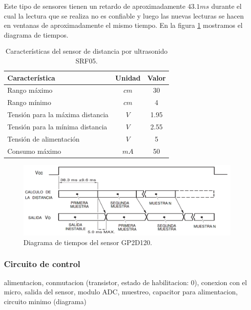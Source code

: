 Este tipo de sensores tienen un retardo de aproximadamente $43.1ms$ durante el cual la lectura que se realiza no es confiable y luego
las nuevas lecturas se hacen en ventanas de aproximadamente el mismo tiempo.
En la figura \ref{hF_gp2d120_pulse} mostramos el diagrama de tiempos.

\begin{table}[ht]
	\begin{center}
		\begin{tabular}{|l|c|c|}
			\hline
			Caracter\'istica & Unidad & Valor\\
			\hline
			Rango m\'aximo & $cm$ & 30 \\
			Rango m\'inimo & $cm$ & 4 \\
			Tensi\'on para la m\'axima distancia & $V$ & 1.95 \\
			Tensi\'on para la m\'inima distancia & $V$ & 2.55 \\
			Tensi\'on de alimentaci\'on & $V$ & 5 \\
			Consumo m\'aximo & $mA$ & 50 \\
			\hline
		\end{tabular}
	\end{center}
	\caption{Caracter\'isticas del sensor de distancia por ultrasonido SRF05.}
	\label{hT_gp2d120}
\end{table}

\begin{figure}[ht]
	\centering
	\includegraphics[scale=0.25]{gp2d120_pulse.png}
	\caption{Diagrama de tiempos del sensor GP2D120.}
	\label{hF_gp2d120_pulse}
\end{figure}

\subsubsection{Circuito de control}
\label{h_sensado_telemetros_circuito}

alimentacion, conmutacion (transistor, estado de habilitacion: 0), conexion con el micro, salida del sensor, modulo ADC, muestreo, capacitor para alimentacion, circuito minimo (diagrama)

